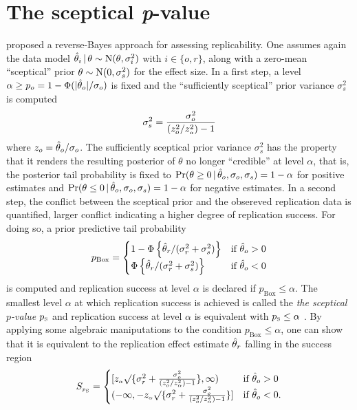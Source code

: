 \documentclass[a4paper, 11pt]{article}
\begin{document}
\section{The sceptical \textit{p}-value}
\citet{Held2020} proposed a reverse-Bayes approach for assessing replicability.
One assumes again the data model
$\hat{\theta}_{i} \,\vert\, \theta \sim \operatorname{N}(\theta, \sigma^{2}_{i})$ with
$i \in \{o, r\}$, along with a zero-mean ``sceptical'' prior
$\theta \sim \operatorname{N}(0, \sigma^{2}_{s})$ for the effect size. In a first step, a
level $\alpha \geq p_{o} = 1 - \Phi(|\hat{\theta}_{o}|/\sigma_{o})$ is fixed and the
``sufficiently sceptical'' prior variance $\sigma^{2}_{s}$ is computed
\begin{align*}
  \sigma^{2}_{s} = \frac{\sigma^{2}_{o}}{(z_{o}^{2}/z_{\scriptscriptstyle \alpha}^{2}) - 1}
\end{align*}
where $z_{o} = \hat{\theta}_{o}/\sigma_{o}$. The sufficiently sceptical prior variance
$\sigma^{2}_{s}$ has the property that it renders the resulting posterior of
$\theta$ no longer ``credible'' at level $\alpha$, that is, the posterior tail
probability is fixed to
$\Pr(\theta \geq 0 \,\vert\, \hat{\theta}_{o}, \sigma_{o}, \sigma_{s}) = 1 - \alpha$ for
positive estimates and
$\Pr(\theta \leq 0 \,\vert\, \hat{\theta}_{o}, \sigma_{o}, \sigma_{s}) = 1 - \alpha$ for
negative estimates. In a second step, the conflict between the sceptical prior
and the obsereved replication data is quantified, larger conflict indicating a
higher degree of replication success. For doing so, a prior predictive tail
probability
\begin{align*}
  p_{\text{Box}} =
  \begin{cases}
    1 - \Phi\left\{\hat{\theta}_{r}/(\sigma^{2}_{r} + \sigma^{2}_{s})\right\}
    & \text{if} ~ \hat{\theta}_{o} > 0 \\
   \Phi\left\{\hat{\theta}_{r}/(\sigma^{2}_{r} + \sigma^{2}_{s})\right\}
    & \text{if} ~ \hat{\theta}_{o} < 0 \\
    \end{cases}
\end{align*}
is computed and replication success at level $\alpha$ is declared if
$p_{\text{Box}} \leq \alpha$. The smallest level $\alpha$ at which replication
success is achieved is called the \emph{the sceptical $p$-value} $\ps$ and
replication success at level $\alpha$ is equivalent with $p_{\scriptscriptstyle\text{S}} \leq \alpha$
\citep[see][for more details on $\ps$]{Held2020, Held2021}. By applying some
algebraic maniputations to the condition $p_{\text{Box}} \leq \alpha$, one can
show that it is equivalent to the replication effect estimate $\hat{\theta}_{r}$
falling in the success region
\begin{align*}
  S_{\scriptscriptstyle p_{\scriptscriptstyle\text{S}}} =
  \begin{cases}
    [z_{\scriptscriptstyle \alpha} \surd\{\sigma^{2}_{r} +
  \frac{\sigma^{2}_{o}}{(z_{o}^{2}/z_{\scriptscriptstyle \alpha}^{2}) - 1}\}, \infty)
    & \text{if} ~ \hat{\theta}_{o} > 0 \\
   (-\infty, -z_{\scriptscriptstyle \alpha} \surd\{\sigma^{2}_{r} +
  \frac{\sigma^{2}_{o}}{(z_{o}^{2}/z_{\scriptscriptstyle \alpha}^{2}) - 1}\}]
    & \text{if} ~ \hat{\theta}_{o} < 0. \\
    \end{cases}
\end{align*}
\end{document}
